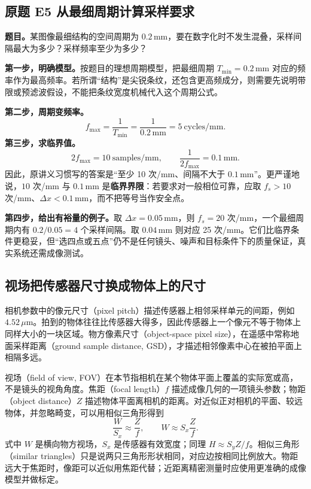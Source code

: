 \subsection*{原题 E5 从最细周期计算采样要求}
\label{original:E5}
\textbf{题目。}某图像最细结构的空间周期为 $0.2\,\mathrm{mm}$，要在数字化时不发生混叠，采样间隔最大为多少？采样频率至少为多少？

\textbf{第一步，明确模型。}按题目的理想周期模型，把最细周期 $T_{\min}=0.2\,\mathrm{mm}$ 对应的频率作为最高频率。若所谓“结构”是尖锐条纹，还包含更高频成分，则需要先说明带限或预滤波假设，不能把条纹宽度机械代入这个周期公式。

\textbf{第二步，周期变频率。}
\[
 f_{\max}=\frac{1}{T_{\min}}
 =\frac{1}{0.2\,\mathrm{mm}}
 =5\ \mathrm{cycles/mm}.
\]
\textbf{第三步，求临界值。}
\[
 2f_{\max}=10\ \mathrm{samples/mm},\qquad
 \frac{1}{2f_{\max}}=0.1\,\mathrm{mm}.
\]
因此，原讲义习惯写的答案是“至少 10 次/mm、间隔不大于 $0.1\,\mathrm{mm}$”。更严谨地说，$10$ 次/mm 与 $0.1\,\mathrm{mm}$ 是\textbf{临界界限}：若要求对一般相位可靠，应取 $f_s>10$ 次/mm、$\Delta x<0.1\,\mathrm{mm}$，而不把等号当作安全点。

\textbf{第四步，给出有裕量的例子。}取 $\Delta x=0.05\,\mathrm{mm}$，则 $f_s=20$ 次/mm，一个最细周期内有 $0.2/0.05=4$ 个采样间隔。取 $0.04\,\mathrm{mm}$ 则对应 25 次/mm。它们比临界条件更稳妥，但“选四点或五点”仍不是任何镜头、噪声和目标条件下的质量保证，真实系统还需成像测试。

\subsection{视场把传感器尺寸换成物体上的尺寸}

相机参数中的像元尺寸（pixel pitch）描述传感器上相邻采样单元的间距，例如 $4.52\,\mu\mathrm{m}$。拍到的物体往往比传感器大得多，因此传感器上一个像元不等于物体上同样大小的一块区域。物方像素尺寸（object-space pixel size），在遥感中常称地面采样距离（ground sample distance, GSD），才描述相邻像素中心在被拍平面上相隔多远。

视场（field of view, FOV）在本节指相机在某个物体平面上覆盖的实际宽或高，不是镜头的视角角度。焦距（focal length）$f$ 描述成像几何的一项镜头参数；物距（object distance）$Z$ 描述物体平面离相机的距离。对近似正对相机的平面、较远物体，并忽略畸变，可以用相似三角形得到
\[
 \frac{W}{S_x}\approx\frac{Z}{f},
 \qquad W\approx S_x\frac{Z}{f}.
\]
式中 $W$ 是横向物方视场，$S_x$ 是传感器有效宽度；同理 $H\approx S_yZ/f$。相似三角形（similar triangles）只是说两只三角形形状相同，对应边按相同比例放大。物距远大于焦距时，像距可以近似用焦距代替；近距离精密测量时应使用更准确的成像模型并做标定。

